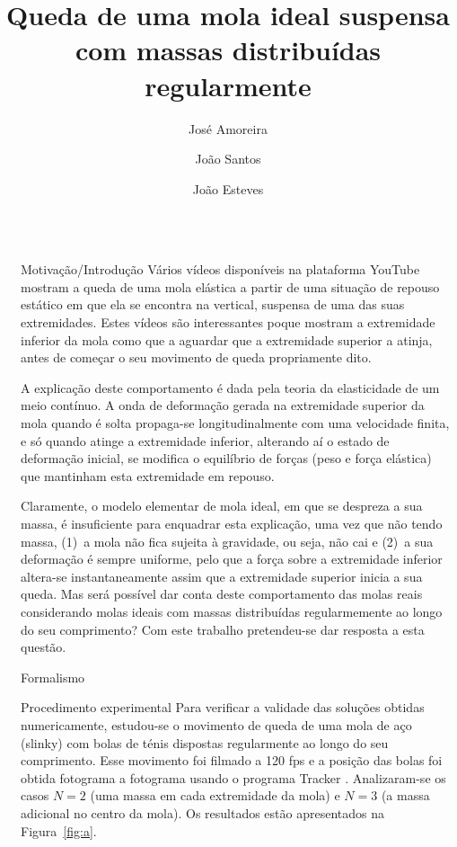 \documentclass[final]{beamer}
\title{Queda de uma mola ideal suspensa com massas distribuídas regularmente}
\author{José Amoreira \inst{1,2,3} \and João Santos \inst{2} \and João Esteves \inst{2}}
\institute[]{\inst{1} Laboratório de Instrumentação e Física Experimental de Partículas \and  \inst{2}Universidade da Beira Interior  \samelineand \inst{3} Centro de Matemática e Aplicações}
\newlength{\sepwidth}
\newlength{\colwidth}
\newcommand{\separatorcolumn}{\begin{column}{\sepwidth}\end{column}}
\begin{document}
\begin{frame}[t]
\begin{columns}[t]
\separatorcolumn
\begin{column}{\colwidth}
\begin{exampleblock}{Motivação/Introdução}
 Vários vídeos disponíveis na plataforma YouTube mostram a queda de uma mola
  elástica a partir de uma situação de repouso estático em que ela se encontra
  na vertical, suspensa de uma das suas extremidades. Estes vídeos são
  interessantes poque mostram a extremidade inferior da mola como que a aguardar
  que a extremidade superior a atinja, antes de começar o seu movimento de queda
  propriamente dito. 
	
  A explicação deste comportamento é dada pela teoria da elasticidade de um meio
  contínuo. A onda de deformação gerada na extremidade superior da mola quando é
  solta propaga-se longitudinalmente com uma velocidade finita, e só quando
  atinge a extremidade inferior, alterando aí o estado de deformação inicial, se
  modifica o equilíbrio de forças (peso e força elástica) que mantinham esta
  extremidade em repouso.
	
  Claramente, o modelo elementar de mola ideal, em que se despreza a sua massa,
  é insuficiente para enquadrar esta explicação, uma vez que não tendo massa,
  (1)~a mola não fica sujeita à gravidade, ou seja, não cai e (2)~a sua
  deformação é sempre uniforme, pelo que a força sobre a extremidade inferior
  altera-se instantaneamente assim que a extremidade superior inicia a sua
  queda. Mas será possível dar conta deste comportamento das molas reais
  considerando molas ideais com massas distribuídas regularmemente ao longo do
  seu comprimento? Com este trabalho pretendeu-se dar resposta a esta questão.
\end{exampleblock}
\begin{block}{Formalismo}
	\vspace{1cm}
	
\end{block}
\begin{block}{Procedimento experimental}
Para verificar a validade das soluções obtidas numericamente, estudou-se o
movimento de queda de uma mola de aço (slinky) com bolas de ténis dispostas
regularmente ao longo do seu comprimento. Esse movimento foi filmado a 120 fps e
a posição das bolas foi obtida fotograma a fotograma usando o programa Tracker
\cite{Tracker}. Analizaram-se os casos $N=2$ (uma massa em cada extremidade da
mola) e $N=3$ (a massa adicional no centro da mola). Os resultados estão
apresentados na Figura~\ref{fig:a}.


\end{block}
\end{column}
\end{columns}
\end{frame}
\end{document}
